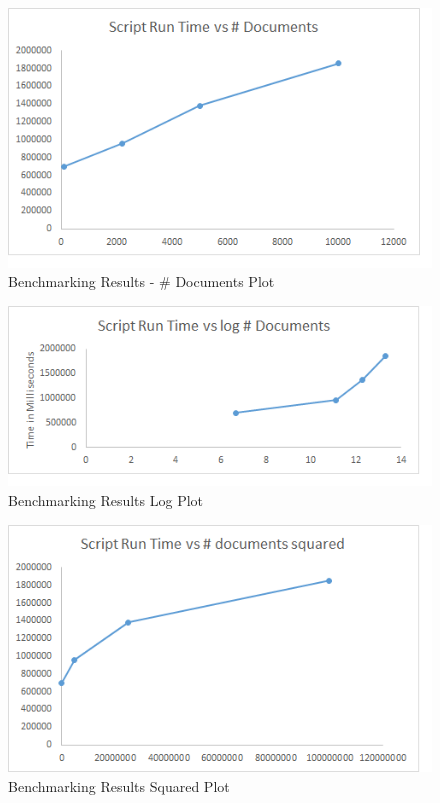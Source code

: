 \documentclass[9pt,twocolumn,twoside]{../../styles/osajnl}
\begin{document}
\begin{figure}[hptb]
\centering
\includegraphics[width=\linewidth]{images/regular.png}
\caption{Benchmarking Results - \# Documents Plot}
\label{fig:regular}
\end{figure}
\begin{figure}[hptb]
\centering
\includegraphics[width=\linewidth]{images/log.png}
\caption{Benchmarking Results Log Plot}
\label{fig:log}
\end{figure}
\begin{figure}[hptb]
\centering
\includegraphics[width=\linewidth]{images/squared.png}
\caption{Benchmarking Results Squared Plot}
\label{fig:squared}
\end{figure}
\end{document}
